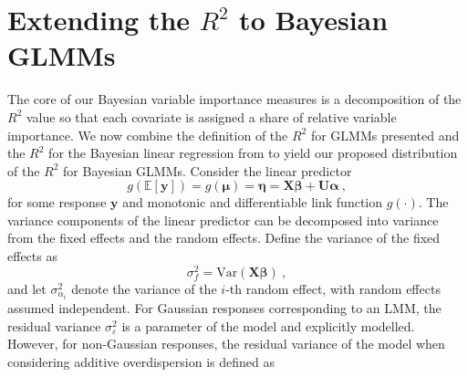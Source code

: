 
\section{Extending the $R^2$ to Bayesian GLMMs}
\label{sec:R2_Bayes_GLMM}
The core of our Bayesian variable importance measures is a decomposition of the $R^2$ value so that each covariate is assigned a share of relative variable importance. We now combine the definition of the $R^2$ for GLMMs presented  and the $R^2$ for the Bayesian linear regression from  to yield our proposed distribution of the $R^2$ for Bayesian GLMMs. Consider the linear predictor 
\begin{equation}
    \label{eq:linear_predictor}
    g(\mathbb{E}[\mathbf{y}]) = g(\boldsymbol{\mu}) = \boldsymbol{\eta} = \mathbf{X}\boldsymbol{\beta} + \mathbf{U}\boldsymbol{\alpha} \ ,
\end{equation} 
for some response $\mathbf{y}$ and monotonic and differentiable link function $g(\cdot)$. 
The variance components of the linear predictor can be decomposed into variance from the fixed effects and the random effects. Define the variance of the fixed effects as 
\begin{equation}
    \sigma_{f}^2 = \text{Var}(\mathbf{X}\boldsymbol{\beta}) \ ,
\end{equation}
and let $\sigma^2_{\alpha_i}$ denote the variance of the $i$-th random effect, with random effects assumed independent. For Gaussian responses corresponding to an LMM, the residual variance $\sigma^2_{\varepsilon}$ is a parameter of the model and explicitly modelled. However, for non-Gaussian responses, the residual variance of the model when considering additive overdispersion is defined as
